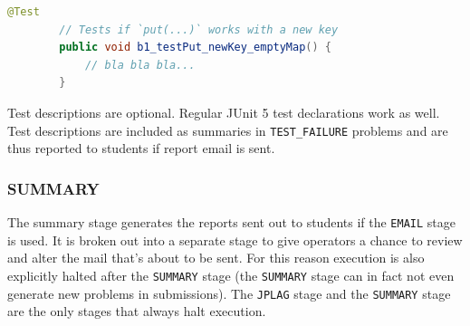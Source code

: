 \documentclass[12pt,a4paper,oneside]{report}
\begin{document}
	\begin{lstlisting}[language=java]
		@Test
		// Tests if `put(...)` works with a new key
		public void b1_testPut_newKey_emptyMap() {
			// bla bla bla...
		}
	\end{lstlisting}

	Test descriptions are optional. Regular JUnit 5 test declarations work as well. Test descriptions are included as summaries in \lstinline|TEST_FAILURE| problems and are thus reported to students if report email is sent.

	\subsubsection{SUMMARY}
	The summary stage generates the reports sent out to students if the \lstinline|EMAIL| stage is used. It is broken out into a separate stage to give operators a chance to review and alter the mail that's about to be sent. For this reason execution is also explicitly halted after the \lstinline|SUMMARY| stage (the \lstinline|SUMMARY| stage can in fact not even generate new problems in submissions). The \lstinline|JPLAG| stage and the \lstinline|SUMMARY| stage are the only stages that always halt execution.
\end{document}
